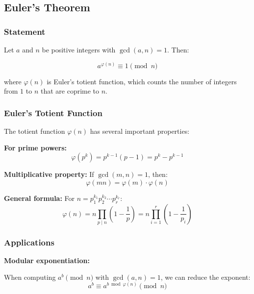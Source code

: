 \subsection{Euler's Theorem}

\subsubsection{Statement}

Let $a$ and $n$ be positive integers with $\gcd(a, n) = 1$. Then:

\begin{equation}
    a^{\varphi(n)} \equiv 1 \pmod{n}
\end{equation}

where $\varphi(n)$ is Euler's totient function, which counts the number of integers from $1$ to $n$ that are coprime to $n$.

\subsubsection{Euler's Totient Function}

The totient function $\varphi(n)$ has several important properties:

\textbf{For prime powers:}
\begin{equation}
    \varphi(p^k) = p^{k-1}(p-1) = p^k - p^{k-1}
\end{equation}

\textbf{Multiplicative property:} If $\gcd(m,n) = 1$, then:
\begin{equation}
    \varphi(mn) = \varphi(m) \cdot \varphi(n)
\end{equation}

\textbf{General formula:} For $n = p_1^{k_1} p_2^{k_2} \cdots p_r^{k_r}$:
\begin{equation}
    \varphi(n) = n \prod_{p \mid n} \left(1 - \frac{1}{p}\right) = n \prod_{i=1}^{r} \left(1 - \frac{1}{p_i}\right)
\end{equation}

\subsubsection{Applications}

\textbf{Modular exponentiation:}

When computing $a^b \pmod{n}$ with $\gcd(a,n) = 1$, we can reduce the exponent:
\begin{equation}
    a^b \equiv a^{b \bmod \varphi(n)} \pmod{n}
\end{equation}

